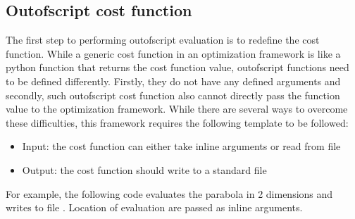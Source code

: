 \documentclass[letterpaper,12pt,english]{sphinxmanual}
\begin{document}
\subsection{Out\sphinxhyphen{}of\sphinxhyphen{}script cost function}
\label{\detokenize{examples/async_local_evaluator_example:out-of-script-cost-function}}
\sphinxAtStartPar
The first step to performing out\sphinxhyphen{}of\sphinxhyphen{}script evaluation is to re\sphinxhyphen{}define the cost function. While a generic cost function
in an optimization framework is like a python function that returns the cost function value, out\sphinxhyphen{}of\sphinxhyphen{}script functions
need to be defined differently. Firstly, they do not have any defined arguments and secondly, such out\sphinxhyphen{}of\sphinxhyphen{}script cost
function also cannot directly pass the function value to the optimization framework. While there are several ways to
overcome these difficulties, this framework requires the following template to be followed:
\begin{itemize}
\item {} 
\sphinxAtStartPar
Input: the cost function can either take inline arguments or read from file

\item {} 
\sphinxAtStartPar
Output: the cost function should write to a standard file

\end{itemize}

\sphinxAtStartPar
For example, the following code evaluates the parabola in 2 dimensions and writes to file . Location of
evaluation are passed as inline arguments.
\end{document}
